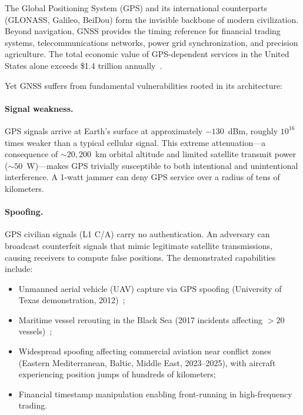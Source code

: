 \documentclass[aps,prd,twocolumn,superscriptaddress,nofootinbib,floatfix]{revtex4-2}
\begin{document}
The Global Positioning System (GPS) and its international counterparts
(GLONASS, Galileo, BeiDou) form the invisible backbone of modern
civilization. Beyond navigation, GNSS provides the timing reference for
financial trading systems, telecommunications networks, power grid
synchronization, and precision agriculture. The total economic value of
GPS-dependent services in the United States alone exceeds \$1.4 trillion
annually~\cite{NIST2019GPS}.

Yet GNSS suffers from fundamental vulnerabilities rooted in its
architecture:

\paragraph{Signal weakness.}
GPS signals arrive at Earth's surface at approximately $-130$~dBm,
roughly $10^{16}$ times weaker than a typical cellular signal. This
extreme attenuation---a consequence of $\sim 20{,}200$~km orbital
altitude and limited satellite transmit power ($\sim 50$~W)---makes GPS
trivially susceptible to both intentional and unintentional interference.
A 1-watt jammer can deny GPS service over a radius of tens of kilometers.

\paragraph{Spoofing.}
GPS civilian signals (L1 C/A) carry no authentication. An adversary can
broadcast counterfeit signals that mimic legitimate satellite
transmissions, causing receivers to compute false positions. The
demonstrated capabilities include:
\begin{itemize}
\item Unmanned aerial vehicle (UAV) capture via GPS spoofing (University
  of Texas demonstration, 2012)~\cite{Humphreys2012};
\item Maritime vessel rerouting in the Black Sea (2017 incidents affecting
  $>20$ vessels)~\cite{CRGroup2017};
\item Widespread spoofing affecting commercial aviation near conflict
  zones (Eastern Mediterranean, Baltic, Middle East, 2023--2025), with
  aircraft experiencing position jumps of hundreds of kilometers;
\item Financial timestamp manipulation enabling front-running in
  high-frequency trading.
\end{itemize}
\end{document}
